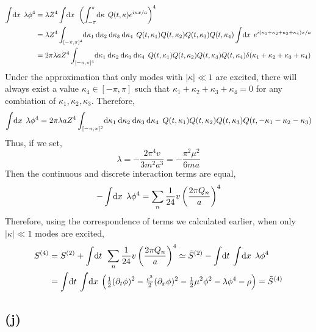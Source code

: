 \documentclass[12pt]{extarticle}
\begin{document}
\begin{align*}
\int \! \mathrm{d}x \: \: \lambda \phi^4 & = \lambda Z^4 \int \! \mathrm{d}x \: \: \left( \int_{-\pi}^{\pi} \! \mathrm{d}\kappa \: \: Q(t, \kappa) e^{i \kappa x / a} \right)^4 
\\
& = \lambda Z^4  \int_{[-\pi, \pi]^4} \! \mathrm{d}\kappa_1 \: \mathrm{d}\kappa_2 \: \mathrm{d}\kappa_3 \: \mathrm{d}\kappa_4 \: \: Q(t, \kappa_1) Q(t, \kappa_2) Q(t, \kappa_3) Q(t, \kappa_4) \int \! \mathrm{d}x \: \: e^{i (\kappa_1 + \kappa_2 + \kappa_3 + \kappa_4) x / a} 
\\
& = 2 \pi \lambda  a Z^4  \int_{[-\pi, \pi]^4} \! \mathrm{d}\kappa_1 \: \mathrm{d}\kappa_2 \: \mathrm{d}\kappa_3 \: \mathrm{d}\kappa_4 \: \: Q(t, \kappa_1) Q(t, \kappa_2) Q(t, \kappa_3) Q(t, \kappa_4) \delta(\kappa_1 + \kappa_2 + \kappa_3 + \kappa_4) \\
\end{align*}
Under the approximation that only modes with $|\kappa| \ll 1$ are excited, there will always exist a value $\kappa_4 \in [-\pi, \pi]$ such that $\kappa_1 + \kappa_2 + \kappa_3 + \kappa_4 = 0$ for any combiation of $\kappa_1, \kappa_2, \kappa_3$. Therefore,
\begin{align*}
\int \! \mathrm{d}x \: \: \lambda \phi^4 = 2 \pi \lambda a Z^4  \int_{[-\pi, \pi]^3} \! \mathrm{d}\kappa_1 \: \mathrm{d}\kappa_2 \: \mathrm{d}\kappa_3 \: \mathrm{d}\kappa_4 \: \: Q(t, \kappa_1) Q(t, \kappa_2) Q(t, \kappa_3) Q(t, -\kappa_1 - \kappa_2 - \kappa_3) \\
\end{align*}
Thus, if we set,
\[ \lambda = - \frac{2 \pi^4 v}{3 m^2 a^3} = - \frac{\pi^2 \mu^2}{6 m a} \]
Then the continuous and discrete interaction terms are equal,
\[ - \int \! \mathrm{d}x \: \: \lambda \phi^4 = \sum_{n} \frac{1}{24} v \left(\frac{2 \pi Q_n}{a} \right)^4\]
Therefore, using the correspondence of terms we calculated earlier, when only $|\kappa| \ll 1$ modes are excited,
\begin{align*}
S^{(4)} & = S^{(2)} + \int \! \mathrm{d}t \: \: \sum_{n} \frac{1}{24} v \left(\frac{2 \pi Q_n}{a} \right)^4 \simeq \tilde{S}^{(2)} - \int \! \mathrm{d}t \: \int \! \mathrm{d}x \: \: \lambda \phi^4 \\
& = \int \! \mathrm{d}t \: \int \! \mathrm{d}x \: \left( \tfrac{1}{2} (\partial_t \phi)^2 - \tfrac{c^2}{2} (\partial_x \phi)^2 - \tfrac{1}{2} \mu^2 \phi^2 - \lambda \phi^4 - \rho \right) = \tilde{S}^{(4)}
\end{align*}

\subsection*{(j)}
\end{document}
